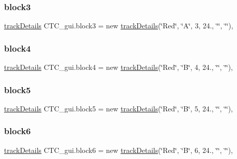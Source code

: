 \subsubsection{\texorpdfstring{block3}{block3}}
{\footnotesize\ttfamily \hyperlink{classtrackDetails}{track\+Details} C\+T\+C\+\_\+gui.\+block3 = new \hyperlink{classtrackDetails}{track\+Details}(\char`\"{}Red\char`\"{}, \char`\"{}A\char`\"{}, 3, 24., \char`\"{}\char`\"{}, \char`\"{}\char`\"{})\hspace{0.3cm}{\ttfamily [static]}, {\ttfamily [package]}}

\mbox{\label{classCTC__gui_a15dab97be71f3b0198ec1e25f76408fe}} 
\subsubsection{\texorpdfstring{block4}{block4}}
{\footnotesize\ttfamily \hyperlink{classtrackDetails}{track\+Details} C\+T\+C\+\_\+gui.\+block4 = new \hyperlink{classtrackDetails}{track\+Details}(\char`\"{}Red\char`\"{}, \char`\"{}B\char`\"{}, 4, 24., \char`\"{}\char`\"{}, \char`\"{}\char`\"{})\hspace{0.3cm}{\ttfamily [static]}, {\ttfamily [package]}}

\mbox{\label{classCTC__gui_a8a1217dd7fb5da4f4179f554d06854d4}} 
\subsubsection{\texorpdfstring{block5}{block5}}
{\footnotesize\ttfamily \hyperlink{classtrackDetails}{track\+Details} C\+T\+C\+\_\+gui.\+block5 = new \hyperlink{classtrackDetails}{track\+Details}(\char`\"{}Red\char`\"{}, \char`\"{}B\char`\"{}, 5, 24., \char`\"{}\char`\"{}, \char`\"{}\char`\"{})\hspace{0.3cm}{\ttfamily [static]}, {\ttfamily [package]}}

\mbox{\label{classCTC__gui_a54becfe14761bd88f15a1757245422c6}} 
\subsubsection{\texorpdfstring{block6}{block6}}
{\footnotesize\ttfamily \hyperlink{classtrackDetails}{track\+Details} C\+T\+C\+\_\+gui.\+block6 = new \hyperlink{classtrackDetails}{track\+Details}(\char`\"{}Red\char`\"{}, \char`\"{}B\char`\"{}, 6, 24., \char`\"{}\char`\"{}, \char`\"{}\char`\"{})\hspace{0.3cm}{\ttfamily [static]}, {\ttfamily [package]}}

